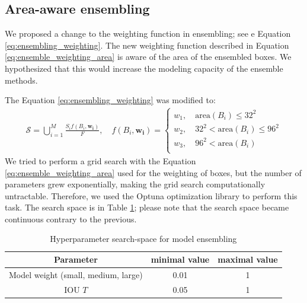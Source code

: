 \subsection{Area-aware ensembling}
\label{sec:methods_area_aware_ens}
We proposed a change to the weighting function in ensembling; see e
Equation \ref{eq:ensembling_weighting}. The new weighting function described in Equation \ref{eq:ensemble_weighting_area} is aware of the area of the ensembled boxes. We hypothesized that this would increase the modeling capacity of the ensemble methods.

The Equation \ref{eq:ensembling_weighting} was modified to:
\begin{align}
    \mathcal{S} = \bigcup_{i=1}^{M} \frac{S_i f(B_i, \mathbf{w_i})}{ F}, \quad
    f(B_i, \mathbf{w_i}) = \begin{cases}
        w_1,\quad \text{area}(B_i) \leq 32^2        \\
        w_2,\quad 32^2 < \text{area}(B_i) \leq 96^2 \\
        w_3,\quad 96^2 < \text{area}(B_i)           \\
    \end{cases}
    \label{eq:ensemble_weighting_area}
\end{align}
We tried to perform a grid search with the Equation \ref{eq:ensemble_weighting_area} used for the weighting of boxes, but the number of parameters grew exponentially, making the grid search computationally untractable. Therefore, we used the Optuna optimization library to perform this task. The search space is in Table \ref{tab:ensembling_search_space_area}; please note that the search space became continuous contrary to the previous.

\begin{table}
    \centering
    \begin{tabular}{|c|c|c|}
        \hline
        Parameter                           & minimal value & maximal value \\ \hline
        Model weight (small, medium, large) & 0.01          & 1             \\ \hline
        IOU $T$                             & 0.05          & 1             \\ \hline
    \end{tabular}
    \caption{Hyperparameter search-space for model ensembling}
    \label{tab:ensembling_search_space_area}
\end{table}


